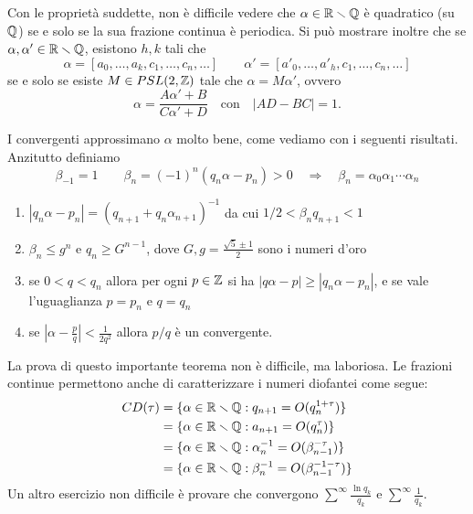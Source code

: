\begin{esempio}
 Con le propriet\`a suddette, non \`e difficile vedere che $\alpha\in\irr$ \`e quadratico (su $\mathbb{Q}$) se e solo se la sua frazione continua  \`e periodica. Si pu\`o mostrare inoltre che se $\alpha,\alpha'\in\mathbb{R}\smallsetminus\mathbb{Q}$, esistono $h,k$ tali che
 \[\alpha=[a_0,\dots,a_k,c_1,\dots,c_n,\dots] \qquad \alpha'=[a'_0,\dots,a'_h,c_1,\dots,c_n,\dots]\]
 se e solo se esiste $M\in PSL(2,\mathbb{Z})$ tale che $\alpha=M\alpha'$, ovvero 
 \[\alpha=\frac{A\alpha'+B}{C\alpha'+D}\quad \mbox{con}\quad |AD-BC|=1.\]
\end{esempio}

I convergenti approssimano $\alpha$ molto bene, come vediamo con i seguenti risultati. Anzitutto definiamo
\[\beta_{-1}=1\qquad \beta_n=(-1)^n(q_n\alpha-p_n)>0 \quad \Rightarrow \quad \beta_n=\alpha_0\alpha_1\cdots \alpha_n\]

\begin{teo}\begin{enumerate} Se $\alpha\in\irr$, valgono
  \item $|q_n\alpha-p_n|=(q_{n+1}+q_n\alpha_{n+1})^{-1}$ da cui $1/2<\beta_nq_{n+1}<1$
  \item $\beta_n\leq g^n$ e $q_n\geq G^{n-1}$, dove $G,g=\frac{\sqrt 5\pm 1}{2}$ sono i numeri d'oro
  \item se $0<q<q_n$ allora per ogni $p\in\mathbb{Z}$ si ha $|q\alpha-p|\geq |q_n\alpha-p_n|$, e se vale l'uguaglianza $p=p_n$ e $q=q_n$
  \item se $\left|\alpha-\frac{p}{q}\right|<\frac{1}{2q^2}$ allora $p/q$  \`e un convergente.
  \end{enumerate}\end{teo}

La prova di questo importante teorema non  \`e difficile, ma laboriosa. Le frazioni continue permettono anche di caratterizzare i numeri diofantei come segue:
\[\begin{split} CD(\tau)&=\{\alpha\in\mathbb{R}\smallsetminus\mathbb{Q}:q_{n+1}=O(q_n^{1+\tau})\}\\
			&=\{\alpha\in\mathbb{R}\smallsetminus\mathbb{Q}:a_{n+1}=O(q_n^{\tau})\}\\
			&=\{\alpha\in\mathbb{R}\smallsetminus\mathbb{Q}:\alpha_n^{-1}=O(\beta_{n-1}^{-\tau})\}\\
			&=\{\alpha\in\mathbb{R}\smallsetminus\mathbb{Q}:\beta_n^{-1}=O(\beta_{n-1}^{-1-\tau})\}
\end{split}\]
Un altro esercizio non difficile  \`e provare che convergono $\sum^\infty\frac{\ln q_k}{q_k}$ e $\sum^\infty\frac{1}{q_k}$.



